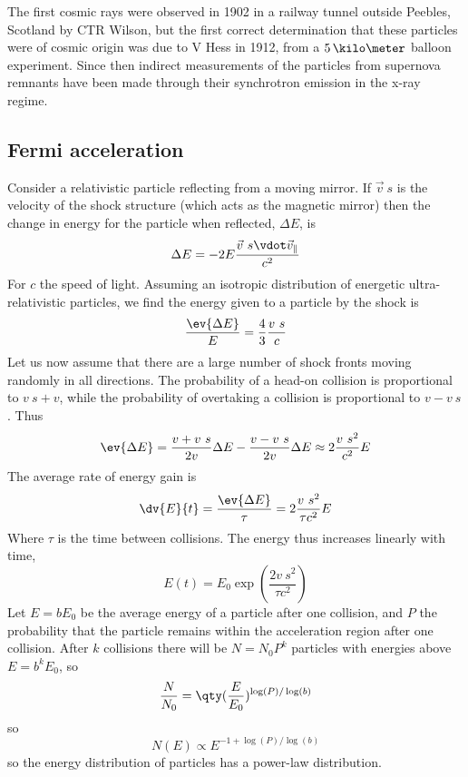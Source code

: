 The first cosmic rays were observed in 1902 in a railway tunnel
outside Peebles, Scotland by CTR Wilson, but the first correct
determination that these particles were of cosmic origin was due to V
Hess in 1912, from a $5\,\kilo\meter$ balloon experiment. Since then
indirect measurements of the particles from supernova remnants have
been made through their synchrotron emission in the x-ray regime.

\subsection{Fermi acceleration}
\label{sec:fermi-acceleration}

Consider a relativistic particle reflecting from a moving mirror. If $\vec{v}~s$
is the velocity of the shock structure (which acts as the magnetic mirror) then the change in energy for the particle when reflected, $\Delta E$, is 
\[ \Delta E = - 2E \frac{\vec{v}~s \vdot \vec{v}_{\parallel}}{c^2} \]
For $c$ the speed of light. Assuming an isotropic distribution of
energetic ultra-relativistic particles, we find the energy given to a
particle by the shock is
\[ \frac{\ev{\Delta E}}{E} = \frac{4}{3} \frac{v~s}{c} \] Let us now
assume that there are a large number of shock fronts moving randomly
in all directions. The probability of a head-on collision is
proportional to $v~s + v$, while the probability of overtaking a
collision is proportional to $v- v~s$. Thus
\begin{equation}
  \label{eq:82}
  \ev{ \Delta E} = \frac{v+v~s}{2 v} \Delta E - \frac{v-v~s}{2 v} \Delta E \approx 2 \frac{v~s^2}{c^2} E
\end{equation} 
The average rate of energy gain is
\begin{equation}
  \label{eq:83}
  \dv{E}{t} = \frac{\ev{\Delta E}}{\tau} = 2 \frac{v~s^2}{\tau c^2} E 
\end{equation}
Where $\tau$ is the time between collisions. The energy thus increases
linearly with time,
\begin{equation}
  \label{eq:84}
  E(t) = E_0 \exp( \frac{2 v~s^2}{\tau c^2})
\end{equation}
Let $E = bE_0$ be the average energy of a particle after one
collision, and $P$ the probability that the particle remains within
the acceleration region after one collision. After $k$ collisions
there will be $N = N_0 P^k$ particles with energies above $E =
b^kE_0$, so
\begin{equation}
  \label{eq:85}
  \frac{N}{N_0} = \qty( \frac{E}{E_0} )^{\log(P) / \log(b)}
\end{equation}
so 
\begin{equation}
  \label{eq:86}
  N(E) \propto E^{-1 + \log(P)/\log(b)}
\end{equation}
so the energy distribution of particles has a power-law distribution.

